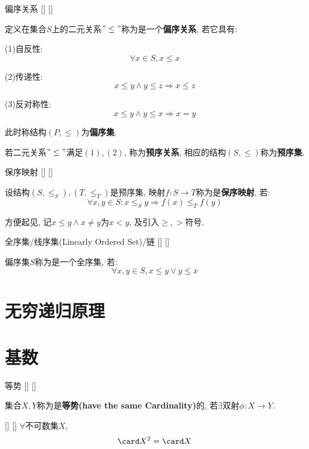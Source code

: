 \documentclass[UTF8]{ctexart}
\begin{document}
    \begin{dfn}
        []
        {偏序关系}
        []
        []


        定义在集合$S$上的二元关系$"\leq"$称为是一个\textbf{偏序关系}, 若它具有: 

        (1)自反性: 
        \[\forall x\in S, x\leq x\]
        
        (2)传递性: 
        \[x\leq y\wedge y\leq z\Longrightarrow x\leq z\]

        (3)反对称性: 
        \[x\leq y\wedge y\leq x\Longrightarrow x=y\]

        此时称结构$(P,\leq)$为\textbf{偏序集}. 

        若二元关系$"\leq"$满足$(1), (2)$, 称为\textbf{预序关系}, 相应的结构$(S,\leq)$称为\textbf{预序集}. 
    \end{dfn}
    
    \begin{dfn}
        []
        {保序映射}
        []
        []


        设结构$(S,\leq_S),(T,\leq_T)$是预序集, 映射$f:S\to T$称为是\textbf{保序映射}, 若: 
        \[\forall x,y\in S: x\leq_S y\Longrightarrow f(x)\leq_T f(y)\]
    \end{dfn}

    方便起见, 记$x\leq y\wedge x\neq y$为$x<y$, 及引入$\geq, >$符号. 
    
    \begin{dfn}
        []
        {全序集/线序集(Linearly Ordered Set)/链}
        []
        []


        偏序集$S$称为是一个全序集, 若: 
        \[\forall x,y\in S, x\leq y\vee y\leq x\]
    \end{dfn}

\section{无穷递归原理}

\section{基数}  
    
    \begin{dfn}
        []
        {等势}
        []
        []


        集合$X,Y$称为是\textbf{等势(have the same Cardinality)}的, 若$\exists$双射$\phi:X\to Y$. 
    \end{dfn}
    
    \begin{thm}
        []
        {}
        []
        []
        $\forall$不可数集$X$, 
        \[\card X^2=\card X\]
    \end{thm}
\end{document}
